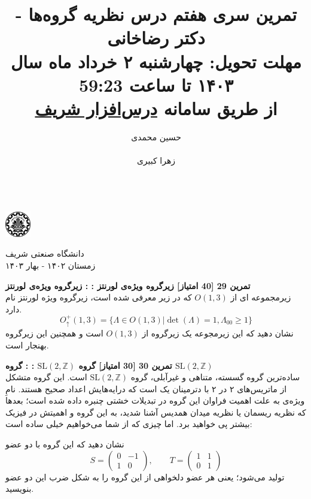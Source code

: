 \documentclass{article}
\title{
	\vspace{-0.8em}
	تمرین سری هفتم درس نظریه گروه‌ها - دکتر رضاخانی
	\\
	{\normalsize
		\textbf{مهلت تحویل:
			چهار‌‌شنبه ۲ خرداد ماه سال ۱۴۰۳ تا ساعت 59:23
			\\
			\vspace{-0.4em}
			از طریق سامانه
			\href{https://cw.sharif.edu/}{درس‌افزار شریف}
		}
	}
	\vspace{-0.6em}
}
\author{
	حسین محمدی\\
	\lr{
		\href{mailto:hossein.mohammadi.00427@gmail.com}{\texttt{	hossein.mohammadi.00427@gmail.com}}} \\
	\And
	زهرا کبیری\\
	\lr{
		\href{mailto:kabiri.zahra98@gmail.com}{ \texttt{kabiri.zahra98@gmail.com}}}\\
}
\newenvironment{exercise}[3][\unskip]{%
	\par
	\noindent
	\textbf{تمرین
		#1
		[#2 امتیاز] 
		\def\temp{#3}\ifx\temp\empty
		: 
		\else
		: #3 \vspace{0.5em} \\ \noindent
		\fi
}}{}
\begin{document}
	
	
	\begin{minipage}{0.1\textwidth}%
		\includegraphics[width=1.1cm]{sharif-logo.png}
	\end{minipage}%
	\hfill%
	\begin{minipage}{0.9\textwidth}\raggedleft
		دانشگاه صنعتی شریف\\
		زمستان ۱۴۰۲ - بهار ۱۴۰۳\\
	\end{minipage}
	
	\makepertitle
	
	
	\begin{exercise}[29]{40}{زیرگروه ویژه‌ی لورنتز}
		زیرمجموعه ای از
		$O(1,3)$
		که در زیر معرفی شده است، زیرگروه ویژه لورنتز نام دارد.
		\[
		O_{\uparrow}^{+}(1,3) = \{\Lambda \in O(1,3) | \det (\Lambda) = 1 , \Lambda_{00} \geq 1 \}
		\]
		نشان دهید که این زیرمجوعه یک زیرگروه از 
		$O(1,3)$
		است و همچنین این زیرگروه بهنجار است.
		
	\end{exercise}
	
	
	\begin{exercise}[30]{30}{گروه 
			$\text{SL}(2,\mathbb{Z})$
		}
		ساده‌ترین گروه گسسته، متناهی و غیرآبلی، گروه $\text{SL}(2,\mathbb{Z})$
		است. این گروه متشکل از ماتریس‌های ۲ در ۲ با دترمینان یک است که درایه‌هایش اعداد صحیح هستند. نامِ ویژه‌ی 
		به علت اهمیت فراوان این گروه در تبدیلات خشتی چنبره
		داده شده است؛ بعدها که نظریه ریسمان یا نظریه میدان همدیس آشنا شدید، به این گروه و اهمیتش در فیزیک بیشتر پی‌ خواهید برد. اما چیزی که از شما می‌خواهیم خیلی ساده است:
		
		\noindent
		نشان دهید که این گروه با دو عضو 
		\[
		S = \begin{pmatrix}
			0 & -1 \\ 1 & 0
		\end{pmatrix} , \qquad T =  \begin{pmatrix}
			1 & 1 \\ 0 & 1
		\end{pmatrix}
		\]
		تولید می‌شود؛ یعنی هر عضو دلخواهی از این گروه را به شکل ضرب این دو عضو بنویسید.
		
	\end{exercise}
	
\end{document}
